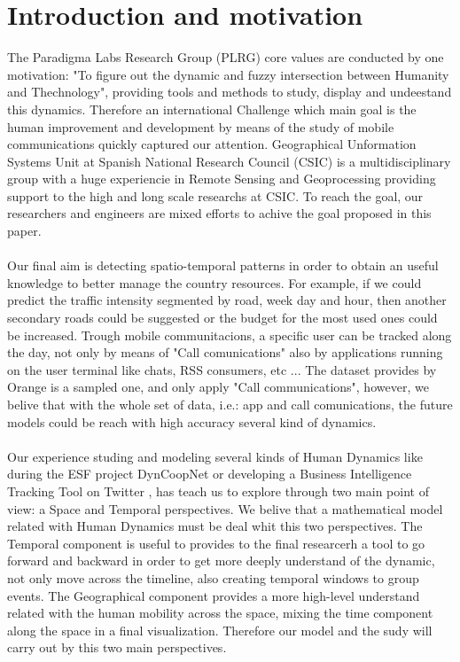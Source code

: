 \newpage

\section{Introduction and motivation}
The Paradigma Labs Research Group (PLRG) core values are conducted by one motivation: "To figure out the dynamic and fuzzy intersection between Humanity and Thechnology", providing tools and methods to study, display and undeestand this dynamics.  Therefore an international Challenge which main goal is the human improvement and development by means of the study of mobile communications quickly captured our attention. Geographical Unformation Systems Unit at Spanish National Research Council  (CSIC) is a multidisciplinary group with a huge experiencie in Remote Sensing and Geoprocessing providing support to the high and long scale researchs at CSIC. To reach the goal, our researchers and engineers are mixed efforts to achive the goal proposed in this paper.
\\
\\
Our final aim is detecting spatio-temporal patterns in order to obtain an useful knowledge to better manage the country resources. For example, if we could predict the traffic intensity segmented by road, week day and hour, then another secondary roads could be suggested or the budget for the most used ones could be increased. Trough mobile communitacions, a specific user can be tracked along the day, not only by means of "Call comunications" also by applications running on the user terminal like chats, RSS consumers, etc ... The dataset provides by Orange is a sampled one, and only apply "Call communications", however, we belive that with the whole set of data, i.e.: app and call comunications, the future models could be reach with high accuracy several kind of dynamics.
\\
\\
Our experience studing and modeling several kinds of Human Dynamics like during the ESF project DynCoopNet\citep{dyncoopnet2012} or developing a Business Intelligence Tracking Tool on Twitter \citep{labselecciones}, has teach us to explore through two main point of view: a Space and Temporal perspectives. We belive that a mathematical model related with Human Dynamics must be deal whit this two perspectives. The Temporal component is useful to provides to the final researcerh a tool to go forward and backward in order to get more deeply understand of the dynamic, not only move across the timeline, also creating temporal windows to group events. The Geographical component provides a more high-level understand related with the human mobility across the space, mixing the time component along the space in a final visualization. Therefore our model and the sudy will carry out by this two main perspectives.
